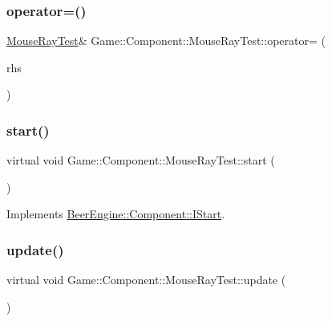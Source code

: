 \subsubsection{\texorpdfstring{operator=()}{operator=()}}
{\footnotesize\ttfamily \mbox{\hyperlink{class_game_1_1_component_1_1_mouse_ray_test}{Mouse\+Ray\+Test}}\& Game\+::\+Component\+::\+Mouse\+Ray\+Test\+::operator= (\begin{DoxyParamCaption}\item[{\mbox{\hyperlink{class_game_1_1_component_1_1_mouse_ray_test}{Mouse\+Ray\+Test}} const \&}]{rhs }\end{DoxyParamCaption})}

\mbox{\label{class_game_1_1_component_1_1_mouse_ray_test_ae0d25b167dd28084ddd677b0593a54f3}} 
\subsubsection{\texorpdfstring{start()}{start()}}
{\footnotesize\ttfamily virtual void Game\+::\+Component\+::\+Mouse\+Ray\+Test\+::start (\begin{DoxyParamCaption}{ }\end{DoxyParamCaption})\hspace{0.3cm}{\ttfamily [virtual]}}



Implements \mbox{\hyperlink{class_beer_engine_1_1_component_1_1_i_start_aa3e25e86e20c46cdaefc6f6d7f21e495}{Beer\+Engine\+::\+Component\+::\+I\+Start}}.

\mbox{\label{class_game_1_1_component_1_1_mouse_ray_test_af5bf853e25dd4e70386dfecd4dc7dab9}} 
\subsubsection{\texorpdfstring{update()}{update()}}
{\footnotesize\ttfamily virtual void Game\+::\+Component\+::\+Mouse\+Ray\+Test\+::update (\begin{DoxyParamCaption}{ }\end{DoxyParamCaption})\hspace{0.3cm}{\ttfamily [virtual]}}



